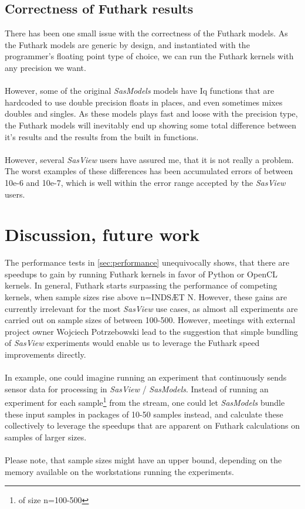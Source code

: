 \documentclass[11pt]{article}
\newcommand{\sasmodels}{\textit{SasModels}}
\newcommand{\sasview}{\textit{SasView}}
\begin{document}
\subsection{Correctness of Futhark results}
\label{sec:correctness}
There has been one small issue with the correctness of the Futhark models.
As the Futhark models are generic by design, and instantiated with the 
programmer's floating point type of choice, we can run the Futhark kernels
with any precision we want.
\\\\
However, some of the original \sasmodels{} models have Iq functions that are 
hardcoded to use double precision floats in places, and even sometimes mixes
doubles and singles. 
As these models plays fast and loose with the precision type, the Futhark models
will inevitably end up showing some total difference between it's results and 
the results from the built in functions.
\\\\
However, several \sasview{} users have assured me, that it is not really a 
problem. The worst examples of these differences has been accumulated errors of
between 10e-6 and 10e-7, which is well within the error range accepted by 
the \sasview{} users.
\section{Discussion, future work}
\label{sec:discussion}
The performance tests in \ref{sec:performance} unequivocally shows, that
there are speedups to gain by running Futhark kernels in favor of Python or
OpenCL kernels.
In general, Futhark starts surpassing the performance of competing kernels, when
sample sizes rise above n=INDSÆT N. However, these gains are currently
irrelevant for the most \sasview{} use cases, as almost all
experiments are carried out on sample sizes of between 100-500.
However, meetings with external project owner Wojciech Potrzebowski lead to the
suggestion that simple bundling of \sasview{} experiments would enable us
to leverage the Futhark speed improvements directly.
\\\\
In example, one could imagine running an experiment that continuously sends
sensor data for processing in \sasview{} / \sasmodels.
Instead of running an experiment for each sample\footnote{of size n=100-500}
from the stream, one could let \sasmodels{} bundle these input samples in packages
of 10-50 samples
instead, and calculate these collectively to leverage the speedups that are
apparent on Futhark calculations on samples of larger sizes.
\\\\
Please note, that sample sizes might have an upper bound, depending on the
memory available on the workstations running the experiments.
\end{document}
